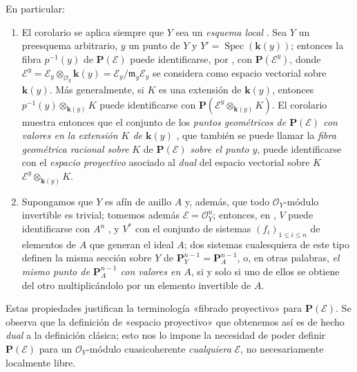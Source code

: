 \documentclass[oneside,10pt]{amsart}
\renewcommand{\leq}{\leqslant}
\newcommand{\oldpage}[2][]{\marginnote{\normalfont\footnotesize\textbf{#1}~|~#2}\ignorespaces}
\begin{document}
\oldpage[II]{75}
En particular:
\begin{enumerate}
  \item El corolario  se aplica siempre que $Y$ sea un \emph{esquema local} .
    Sea $Y$ un preesquema arbitrario, $y$ un punto de $Y$ y $Y'=\operatorname{Spec}(\boldsymbol{k}(y))$;
    entonces la fibra $p^{-1}(y)$ de $\mathbf{P}(\mathcal{E})$ puede identificarse, por , con $\mathbf{P}(\mathcal{E}^y)$, donde $\mathcal{E}^y=\mathcal{E}_y\otimes_{\mathcal{O}_y}\boldsymbol{k}(y)
  =\mathcal{E}_y/\mathfrak{m}_y\mathcal{E}_y$ se considera como espacio vectorial sobre $\boldsymbol{k}(y)$.
    Más generalmente, si $K$ es una extensión de $\boldsymbol{k}(y)$, entonces $p^{-1}(y)\otimes_{\boldsymbol{k}(y)}K$ puede identificarse con $\mathbf{P}(\mathcal{E}^y\otimes_{\boldsymbol{k}(y)}K)$.
    El corolario  muestra entonces que el conjunto de los \emph{puntos geométricos de $\mathbf{P}(\mathcal{E})$ con valores en la extensión $K$ de $\boldsymbol{k}(y)$} , que también se puede llamar la \emph{fibra geométrica racional sobre} $K$ de $\mathbf{P}(\mathcal{E})$ \emph{sobre el punto $y$}, puede identificarse con el \emph{espacio proyectivo} asociado al \emph{dual} del espacio vectorial sobre $K$ $\mathcal{E}^y\otimes_{\boldsymbol{k}(y)}K$.
  \item Supongamos que $Y$ es afín de anillo $A$ y, además, que todo $\mathcal{O}_Y$-módulo invertible es trivial;
    tomemos además $\mathcal{E}=\mathcal{O}_Y^n$;
    entonces, en , $V$ puede identificarse con $A^n$ , y $V^*$ con el conjunto de sistemas $(f_i)_{1\leq i\leq n}$ de elementos de $A$ que generan el ideal $A$;
    dos sistemas cualesquiera de este tipo definen la misma sección sobre $Y$ de $\mathbf{P}_Y^{n-1}=\mathbf{P}_A^{n-1}$, o, en otras palabras, \emph{el mismo punto de $\mathbf{P}_A^{n-1}$ con valores en $A$}, si y solo si uno de ellos se obtiene del otro multiplicándolo por un elemento invertible de $A$.
\end{enumerate}

Estas propiedades justifican la terminología «fibrado proyectivo» para $\mathbf{P}(\mathcal{E})$.
Se observa que la definición de «espacio proyectivo» que obtenemos así es de hecho \emph{dual} a la definición clásica;
esto nos lo impone la necesidad de poder definir $\mathbf{P}(\mathcal{E})$ para un $\mathcal{O}_Y$-módulo cuasicoherente \emph{cualquiera} $\mathcal{E}$, no necesariamente localmente libre.
\end{document}
